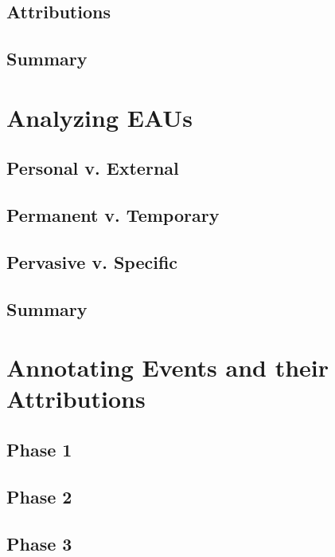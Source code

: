 \documentclass[a4paper,12pt]{article}
\begin{document}
\subsection{Attributions}
\subsection{Summary}

\section{Analyzing EAUs}
\subsection{Personal v. External}
\subsection{Permanent v. Temporary}
\subsection{Pervasive v. Specific}
\subsection{Summary}

\section{Annotating Events and their Attributions}
\subsection{Phase 1}
\subsection{Phase 2}
\subsection{Phase 3}
\end{document}
